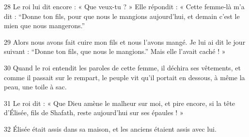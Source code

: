 
28 Le roi lui dit encore : « Que veux-tu ? » Elle répondit : « Cette femme-là m’a dit : “Donne ton fils, pour que nous le mangions aujourd’hui, et demain c’est le mien que nous mangerons.”

29 Alors nous avons fait cuire mon fils et nous l’avons mangé. Je lui ai dit le jour suivant : “Donne ton fils, que nous le mangions.” Mais elle l’avait caché ! »

30 Quand le roi entendit les paroles de cette femme, il déchira ses vêtements, et comme il passait sur le rempart, le peuple vit qu’il portait en dessous, à même la peau, une toile à sac.

31 Le roi dit : « Que Dieu amène le malheur sur moi, et pire encore, si la tête d’Élisée, fils de Shafath, reste aujourd’hui sur ses épaules ! »

32 Élisée était assis dans sa maison, et les anciens étaient assis avec lui. 